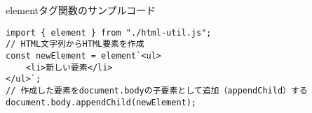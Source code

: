 \begin{listtitle}
elementタグ関数のサンプルコード
\end{listtitle}
\begin{lstlisting}
import { element } from "./html-util.js";
// HTML文字列からHTML要素を作成
const newElement = element`<ul>
    <li>新しい要素</li>
</ul>`;
// 作成した要素をdocument.bodyの子要素として追加（appendChild）する
document.body.appendChild(newElement);
\end{lstlisting}
\listend
